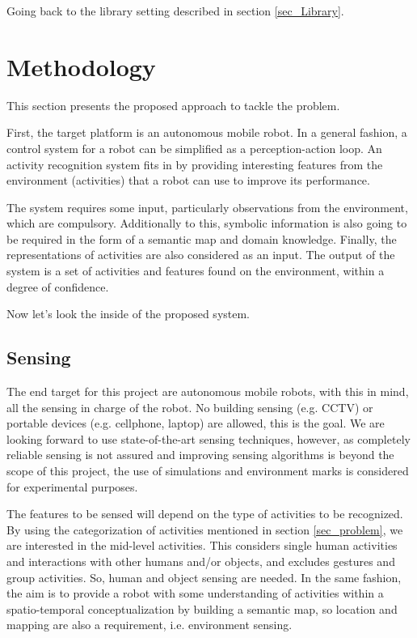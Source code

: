 Going back to the library setting described in section \ref{sec_Library}. %


\section{Methodology}

This section presents the proposed approach to tackle the problem.

First, the target platform is an autonomous mobile robot.
In a general fashion, a control system for a robot can be simplified as a perception-action loop. %
An activity recognition system fits in by providing interesting features from the environment (activities) that a robot can use to improve its performance.

The system requires some input, particularly observations from the environment, which are compulsory.
Additionally to this, symbolic information is also going to be required in the form of a semantic map and domain knowledge.
Finally, the representations of activities are also considered as an input.
The output of the system is a set of activities and features found on the environment, within a degree of confidence.


Now let's look the inside of the proposed system.

\subsection{Sensing}

The end target for this project are autonomous mobile robots, with this in mind, all the sensing in charge of the robot. 
No building sensing (e.g. CCTV) or portable devices (e.g. cellphone, laptop) are allowed, this is the goal.
We are looking forward to use state-of-the-art sensing techniques, however, as completely reliable sensing is not assured and improving sensing algorithms is beyond the scope of this project, the use of simulations and environment marks is considered for experimental purposes. %

The features to be sensed will depend on the type of activities to be recognized.
By using the categorization of activities mentioned in section \ref{sec_problem}, we are interested in the mid-level activities.
This considers single human activities and interactions with other humans and/or objects, and excludes gestures and group activities.
So, human and object sensing are needed.
In the same fashion, the aim is to provide a robot with some understanding of activities within a spatio-temporal conceptualization by building a semantic map, so location and mapping are also a requirement, i.e. environment sensing.

